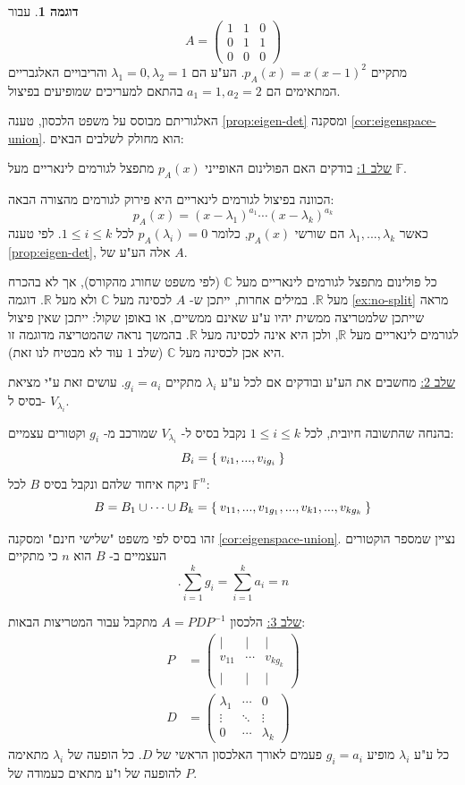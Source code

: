 \documentclass[12pt]{report}
\theoremstyle{plain}
\theoremstyle{definition}
\newtheorem{example}{דוגמה}[chapter]
\newcommand{\R}{\mathbb{R}}
\newcommand{\C}{\mathbb{C}}
\newcommand{\F}{\mathbb{F}}
\newcommand{\0}{\mathbf{0}}
\begin{document}
\begin{example}
עבור
$$
A=\begin{pmatrix}
1 & 1 & 0 \\
0 & 1 & 1 \\
0 & 0 & 0
\end{pmatrix}
$$
מתקיים
$p_A(x)=x(x-1)^2$.
הע"ע הם
$\lambda_1=0,\lambda_2=1$
והריבויים האלגבריים המתאימים הם
$a_1=1,a_2=2$
בהתאם למעריכים שמופיעים בפיצול.
\end{example}

האלגוריתם מבוסס על משפט הלכסון, טענה
\ref{prop:eigen-det}
ומסקנה
\ref{cor:eigenspace-union}.
הוא מחולק לשלבים הבאים:

\underline{שלב 1:}
בודקים האם הפולינום האופייני
$p_A(x)$
מתפצל לגורמים לינאריים מעל
$\F$.

הכוונה בפיצול לגורמים לינאריים היא פירוק לגורמים מהצורה הבאה:
$$
p_A(x)=(x-\lambda_1)^{a_1}\cdots (x-\lambda_k)^{a_k}
$$
כאשר
$\lambda_1,...,\lambda_k$
הם שורשי
$p_A(x)$,
כלומר
$p_A(\lambda_i)=0$
לכל
$1\leq i\leq k$.
לפי טענה
\ref{prop:eigen-det},
אלה הע"ע של
$A$.

כל פולינום מתפצל לגורמים לינאריים מעל
$\C$
(לפי משפט שחורג מהקורס),
אך לא בהכרח מעל 
$\R$.
במילים אחרות, ייתכן ש-
$A$
לכסינה מעל
$\C$
ולא מעל
$\R$.
דוגמה
\ref{ex:no-split}
מראה שייתכן שלמטריצה ממשית יהיו ע"ע שאינם ממשיים,
או באופן שקול: ייתכן שאין פיצול לגורמים לינאריים מעל 
$\R$,
ולכן היא אינה לכסינה מעל
$\R$.
בהמשך נראה שהמטריצה מדוגמה זו היא אכן לכסינה מעל
$\C$
(שלב 
$1$
עוד לא מבטיח לנו זאת).

\underline{שלב 2:}
מחשבים את הע"ע ובודקים אם לכל ע"ע 
$\lambda_i$
מתקיים
$g_i=a_i$.
עושים זאת
ע"י מציאת בסיס ל-
$V_{\lambda_i}$.

בהנחה שהתשובה חיובית, לכל
$1\leq i\leq k$
נקבל בסיס ל-
$V_{\lambda_i}$
שמורכב מ-
$g_i$
וקטורים עצמיים:
$$
B_i=\Set{v_{i1},...,v_{ig_i}}
$$
ניקח איחוד שלהם ונקבל בסיס 
$B$
לכל
$\F^n$:
$$
B=B_1\cup \cdots \cup B_k=\Set{v_{11},...,v_{1g_1},...,v_{k1},...,v_{kg_k}}
$$

זהו בסיס לפי משפט "שלישי חינם"
ומסקנה 
\ref{cor:eigenspace-union}. 
נציין שמספר הוקטורים העצמיים ב-
$B$
הוא
$n$
כי מתקיים
$$
.\sum_{i=1}^k g_i=\sum_{i=1}^k a_i=n
$$

\underline{שלב 3:}
הלכסון 
$A=PDP^{-1}$
מתקבל עבור המטריצות הבאות:
$$
\begin{aligned}
P&=\begin{pmatrix}
\big| & \big|        & \big| \\
v_{11} & \cdots & v_{kg_k} \\
\big| & \big|         & \big|
\end{pmatrix}\\
D&=\begin{pmatrix}
\lambda_1 & \cdots & 0 \\
\vdots & \ddots & \vdots \\
0  & \cdots & \lambda_k
\end{pmatrix}
\end{aligned}
$$
כל ע"ע 
$\lambda_i$
מופיע
$g_i=a_i$
פעמים לאורך האלכסון הראשי של
$D$.
כל הופעה של 
$\lambda_i$
מתאימה להופעה של ו"ע מתאים כעמודה של
$P$.
\end{document}
